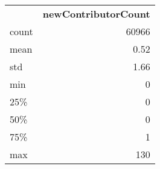 \begin{tabular}{lr}
 & \textbf{newContributorCount} \\
count & 60966 \\
mean & 0.52 \\
std & 1.66 \\
min & 0 \\
25\% & 0 \\
50\% & 0 \\
75\% & 1 \\
max & 130 \\
\end{tabular}
